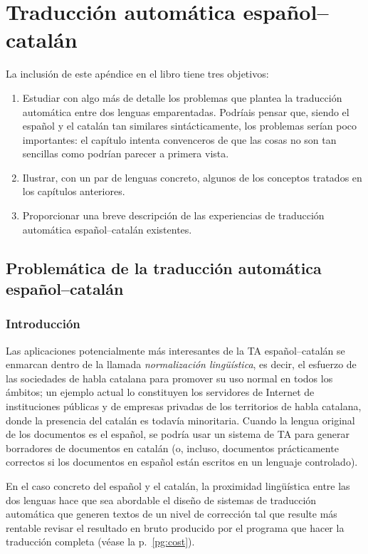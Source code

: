 \chapter{Traducción automática español--catalán} \label{se:PdTACC} 

La inclusión de este apéndice en el libro tiene tres objetivos: \begin{enumerate} \item Estudiar con algo más de detalle los problemas que plantea la traducción automática entre dos lenguas emparentadas. Podríais pensar que, siendo el español y el catalán tan similares sintácticamente, los problemas serían poco importantes: el capítulo intenta convenceros de que las cosas no son tan sencillas como podrían parecer a primera vista. \item Ilustrar, con un par de lenguas concreto, algunos de los conceptos tratados en los capítulos anteriores. \item Proporcionar una breve descripción de las experiencias de traducción automática español--catalán existentes. \end{enumerate} 

\section{Problemática de la traducción automática español--catalán} 

\subsection{Introducción} 

Las aplicaciones potencialmente más interesantes de la TA español--catalán se enmarcan dentro de la llamada {\em normalización lingüística}, es decir, el esfuerzo de las sociedades de habla catalana para promover su uso normal en todos los ámbitos; un ejemplo actual lo constituyen los servidores de Internet de instituciones públicas y de empresas privadas de los territorios de habla catalana, donde la presencia del catalán es todavía minoritaria. Cuando la lengua original de los documentos es el español, se podría usar un sistema de TA para generar borradores de documentos en catalán (o, incluso, documentos prácticamente correctos si los documentos en español están escritos en un lenguaje controlado). 

En el caso concreto del español y el catalán, la proximidad lingüística entre las dos lenguas hace que sea abordable el diseño de sistemas de traducción automática que generen textos de un nivel de corrección tal que resulte más rentable revisar el resultado en bruto producido por el programa que hacer la traducción completa (véase la p.~\ref{pg:cost}). 

